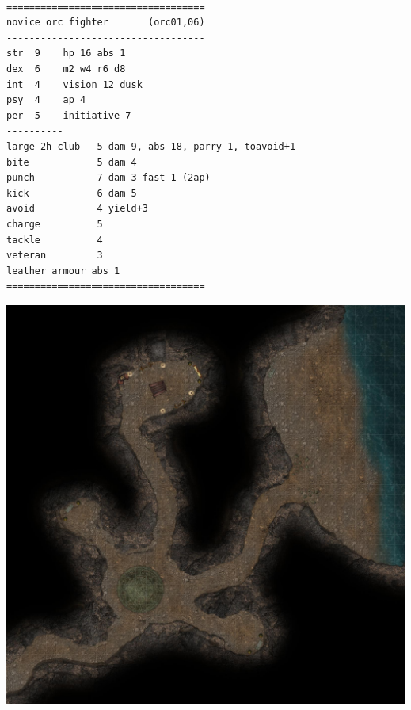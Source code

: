 \

\goodbreak \begin{samepage} \small \begin{verbatim}
===================================
novice orc fighter       (orc01,06)
-----------------------------------
str  9    hp 16 abs 1
dex  6    m2 w4 r6 d8
int  4    vision 12 dusk
psy  4    ap 4
per  5    initiative 7
----------
large 2h club   5 dam 9, abs 18, parry-1, toavoid+1
bite           	5 dam 4
punch          	7 dam 3 fast 1 (2ap)
kick            6 dam 5
avoid          	4 yield+3
charge         	5
tackle         	4
veteran        	3
leather armour abs 1
===================================
\end{verbatim} \normalsize \end{samepage}






\clearpage
\thispagestyle{empty}

\null

\vfill

\noindent
\includegraphics[width=0.999\textwidth]{./map/cave.jpg}

\vfill







